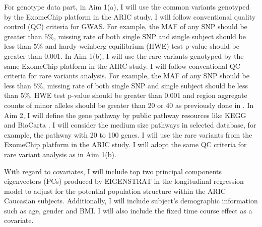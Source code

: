 \documentclass[12pt]{article}
\begin{document}
For genotype data part, in Aim 1(a), I will use the common variants genotyped by the ExomeChip \cite{Grove2013} platform in the ARIC study. I will follow conventional quality control (QC) criteria for GWAS. For example, the MAF of any SNP should be greater than $5\%$, missing rate of both single SNP and single subject should be less than $5\%$  and hardy-weinberg-equilibrium (HWE) test p-value should be greater than $0.001$. In Aim 1(b), I will use the rare variants genotyped by the same ExomeChip platform in the AIRC study. I will follow conventional QC criteria for rare variants analysis. For example, the MAF of any SNP should be less than $5\%$, missing rate of both single SNP and single subject should be less than $5\%$, HWE test p-value should be greater than $0.001$ and region aggregate counts of minor alleles should be greater than 20 or 40 as previously done in \cite{Lange2014,Peloso2014}. In Aim 2, I will define the gene pathway by public pathway resources like KEGG \cite{Ogata1999} and BioCarta \cite{Nishimura2001}. I will consider the medium size pathways in selected database, for example, the pathway with 20 to 100 genes. I will use the rare variants from the ExomeChip platform \cite{Grove2013} in the ARIC study. I will adopt the same QC criteria for rare variant analysis as in Aim 1(b). 


With regard to covariates, I will include top two principal components eigenvectors (PCs) produced by EIGENSTRAT \cite{Price2006} in the longitudinal regression model to adjust for the potential population structure within the ARIC Caucasian subjects. Additionally, I will include subject's demographic information such as age, gender and BMI. I will also include the fixed time course effect as a covariate.
\end{document}
